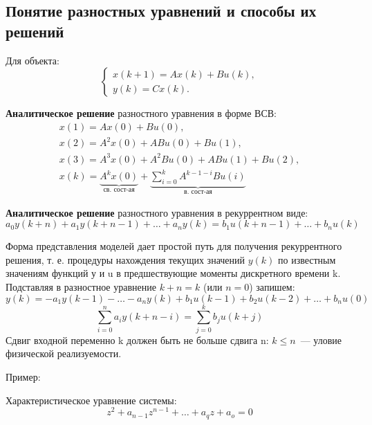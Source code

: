 \subsection{Понятие разностных уравнений и способы их решений}

Для объекта:
\begin{equation}
    \begin{cases}
        x(k+1) = A x(k) + Bu(k),\\
        y(k) = C x(k).
    \end{cases}
\end{equation}

\textbf{Аналитическое решение} разностного уравнения в форме ВСВ:
\begin{gather}
    x(1) = A x(0) + B u(0),\\
    x(2) = A^{2} x(0) + A B u(0) + B u(1),\\
    x(3) = A^3 x(0) + A^2 B u(0) + A B u(1) + B u(2),\\
    x(k) = \underbrace{A^k x(0)}_{\text{св. сост-ая}} + 
    \underbrace{\sum\limits_{i=0}^{k} A^{k-1-i} B u(i)}_{\text{в. сост-ая}}
\end{gather}

\textbf{Аналитическое решение} разностного уравнения в рекуррентном виде:
\begin{equation}
    a_0 y(k+n) + a_1 y(k+n-1) +\dots+ a_n y(k) = b_1 u(k+n-1) +\dots+ b_n u(k)
\end{equation}

Форма представления моделей дает простой путь для получения рекуррентного решения, т. е. процедуры нахождения текущих значений $y(k)$ по известным значениям функций у и u в предшествующие моменты дискретного времени k. Подставляя в разностное уравнение $k+n=k$ (или $n= 0$) запишем:
\begin{equation}
    y(k) = -a_1 y(k-1) -\dots- a_n y(k) + b_1 u(k-1) + b_2 u(k-2) + \dots + b_n u(0)
\end{equation}
\begin{equation}
    \sum\limits_{i=0}^{n} a_i y (k+n-i) = \sum\limits_{j=0}^{k} b_j u(k+j)
\end{equation}
Сдвиг входной переменно k должен быть не больше сдвига n: $k \le n$~--- уловие физической реализуемости.

Пример:

Характеристическое уравнение системы:
\begin{equation}
    z^2 + a_{n-1} z^{n-1} + \dots + a_q z + a_o = 0
\end{equation}

